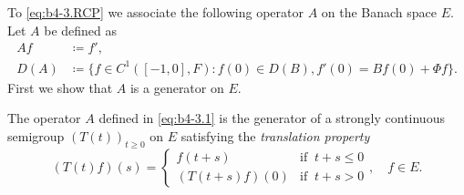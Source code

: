 To \eqref{eq:b4-3.RCP} we associate the following operator $A$ on the Banach space $E$.
Let $A$ be defined as
\begin{equation}\label{eq:b4-3.1}
	\begin{aligned}
		Af & \coloneq  f'  ,\\
		D(A) & \coloneq  \{f \in C^1([-1,0],F) \colon f(0) \in D(B), f'(0) = Bf(0) + \Phi f\} .
	\end{aligned}
\end{equation}
First we show that $A$ is a generator on $E$.
\begin{theorem}\label{thm:b4-3.1}
	The operator $A$ defined in \eqref{eq:b4-3.1} is the generator of a strongly continuous semigroup $(T(t))_{t\geq 0}$ on $E$ satisfying the \emph{translation property}
\begin{equation*}\label{eq:b4-3.T} \tag{T}
    (T(t)f)(s) = 
    \begin{cases} 
        f(t+s) & \text{if } \ t+s \leq 0 \\
        (T(t+s)f)(0) & \text{if } \ t+s  >  0 
    \end{cases}, \quad f \in E .
\end{equation*}
\end{theorem}
